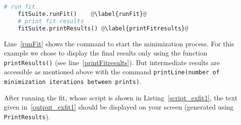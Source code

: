 

\begin{lstlisting}[language=python, style=eclipseboxed, name=exfit,nolol]
    # run fit 
    fitSuite.runFit()    @\label{runFit}@
    # print fit results
    fitSuite.printResults() @\label{printFitresults}@
\end{lstlisting}

Line~\ref{runFit} shows the command to start the minimization
process. For this example we chose to display the final results only
using the function \texttt{printResults()} (see
line~\ref{printFitresults}). But intermediate results are accessible as
mentioned above with the command \texttt{printLine(number of
 minimization iterations between prints)}.

After running the fit, whose script is shown in
Listing~\ref{script_exfit1}, the text given in~\ref{output_exfit1} should be displayed on your
screen (generated using \texttt{PrintResults}).


